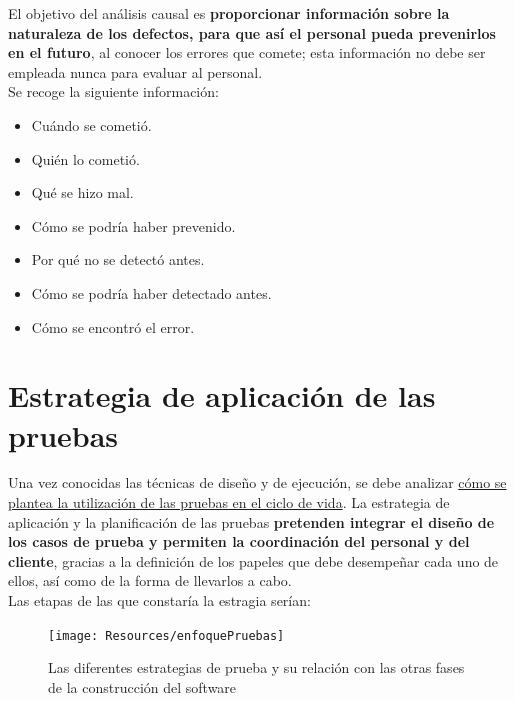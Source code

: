 El objetivo del análisis causal es \textbf{proporcionar información sobre la naturaleza de los defectos, para que así el personal pueda prevenirlos en el futuro}, al conocer los errores que comete; esta información no debe ser empleada nunca para evaluar al personal.\\

Se recoge la siguiente información:
\begin{itemize}
    \item Cuándo se cometió.
    \item Quién lo cometió.
    \item Qué se hizo mal.
    \item Cómo se podría haber prevenido.
    \item Por qué no se detectó antes.
    \item Cómo se podría haber detectado antes.
    \item Cómo se encontró el error.
\end{itemize}


\section{Estrategia de aplicación de las pruebas}

Una vez conocidas las técnicas de diseño y de ejecución, se debe analizar \uline{cómo se plantea la utilización de las pruebas en el ciclo de vida}. La estrategia de aplicación y la planificación de las pruebas \textbf{pretenden integrar el diseño de los casos de prueba y permiten la coordinación del personal y del cliente}, gracias a la definición de los papeles que debe desempeñar cada uno de ellos, así como de la forma de llevarlos a cabo.\\

Las etapas de las que constaría la estragia serían:

\begin{figure}[H]
    \centering
    \texttt{[image: Resources/enfoquePruebas]}
    \caption{Las diferentes estrategias de prueba y su relación con las otras fases de la construcción del software}
    \label{fig:estrategiasPruebas}
\end{figure}

